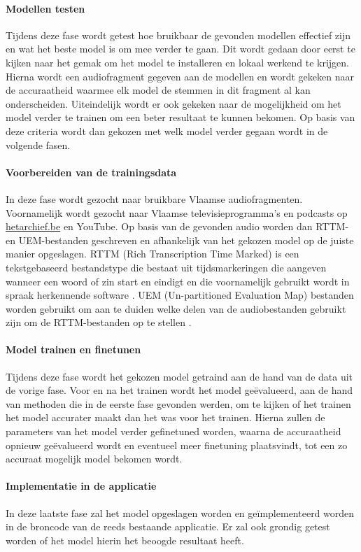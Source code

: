 \paragraph{Modellen testen}
Tijdens deze fase wordt getest hoe bruikbaar de gevonden modellen effectief zijn en wat het beste model is om mee verder te gaan. Dit wordt gedaan door eerst te kijken naar het gemak om het model te installeren en lokaal werkend te krijgen. Hierna wordt een audiofragment gegeven aan de modellen en wordt gekeken naar de accuraatheid waarmee elk model de stemmen in dit fragment al kan onderscheiden. Uiteindelijk wordt er ook gekeken naar de mogelijkheid om het model verder te trainen om een beter resultaat te kunnen bekomen. Op basis van deze criteria wordt dan gekozen met welk model verder gegaan wordt in de volgende fasen.

\paragraph{Voorbereiden van de trainingsdata}
In deze fase wordt gezocht naar bruikbare Vlaamse audiofragmenten. Voornamelijk wordt gezocht naar Vlaamse televisieprogramma's en podcasts op \url{hetarchief.be} en YouTube. Op basis van de gevonden audio worden dan RTTM- en UEM-bestanden geschreven en afhankelijk van het gekozen model op de juiste manier opgeslagen. RTTM (Rich Transcription Time Marked) is een tekstgebaseerd bestandstype die bestaat uit tijdsmarkeringen die aangeven wanneer een woord of zin start en eindigt en die voornamelijk gebruikt wordt in spraak herkennende software \autocite{filext}. UEM (Un-partitioned Evaluation Map) bestanden worden gebruikt om aan te duiden welke delen van de audiobestanden gebruikt zijn om de RTTM-bestanden op te stellen \autocite{Ryant}.

\paragraph{Model trainen en finetunen}
Tijdens deze fase wordt het gekozen model getraind aan de hand van de data uit de vorige fase. Voor en na het trainen wordt het model geëvalueerd, aan de hand van methoden die in de eerste fase gevonden werden, om te kijken of het trainen het model accurater maakt dan het was voor het trainen. Hierna zullen de parameters van het model verder gefinetuned worden, waarna de accuraatheid opnieuw geëvalueerd wordt en eventueel meer finetuning plaatsvindt, tot een zo accuraat mogelijk model bekomen wordt.

\paragraph{Implementatie in de applicatie}
In deze laatste fase zal het model opgeslagen worden en geïmplementeerd worden in de broncode van de reeds bestaande applicatie. Er zal ook grondig getest worden of het model hierin het beoogde resultaat heeft.

